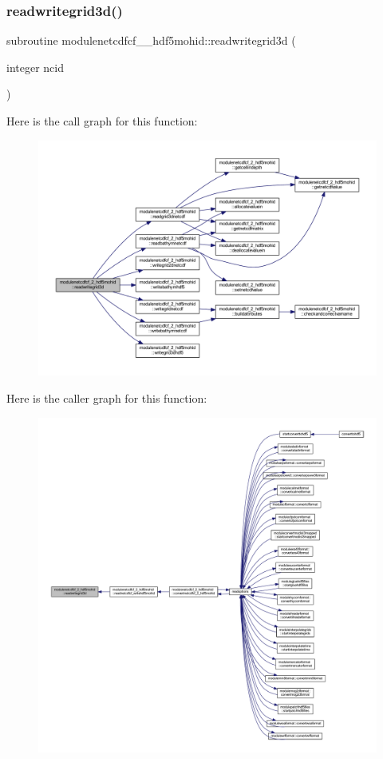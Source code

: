 \subsubsection{\texorpdfstring{readwritegrid3d()}{readwritegrid3d()}}
{\footnotesize\ttfamily subroutine modulenetcdfcf\+\_\+\_\+hdf5mohid\+::readwritegrid3d (\begin{DoxyParamCaption}\item[{integer}]{ncid }\end{DoxyParamCaption})\hspace{0.3cm}{\ttfamily [private]}}

Here is the call graph for this function\+:\nopagebreak
\begin{figure}[H]
\begin{center}
\leavevmode
\includegraphics[width=350pt]{namespacemodulenetcdfcf__2__hdf5mohid_a80bb913f46008900376c9030ad45a641_cgraph}
\end{center}
\end{figure}
Here is the caller graph for this function\+:\nopagebreak
\begin{figure}[H]
\begin{center}
\leavevmode
\includegraphics[width=350pt]{namespacemodulenetcdfcf__2__hdf5mohid_a80bb913f46008900376c9030ad45a641_icgraph}
\end{center}
\end{figure}
